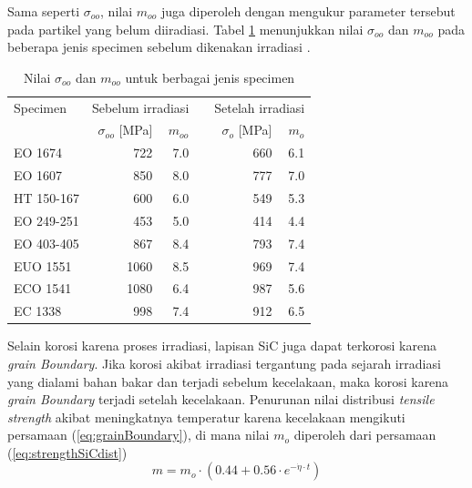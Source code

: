\documentclass[a4paper,11pt]{report}
\newcommand{\ra}[1]{\renewcommand{\arraystretch}{#1}}
\begin{document}
Sama seperti $\sigma_{oo}$, nilai $m_{oo}$ juga diperoleh dengan mengukur parameter tersebut pada partikel yang belum diiradiasi. Tabel \ref{tab:oo} menunjukkan nilai $\sigma_{oo}$ dan $m_{oo}$ pada beberapa jenis specimen sebelum dikenakan irradiasi \cite{report1}.%


\begin{table}
  \caption[Nilai $\sigma_{oo}$ dan $m_{oo}$ untuk berbagai jenis specimen]{Nilai $\sigma_{oo}$ dan $m_{oo}$ untuk berbagai jenis specimen\cite{report1}}
  \label{tab:oo}

  \begin{center}
  \ra{1.3}
    \begin{tabular}{@{}lrrcrr@{}}\toprule
    Specimen & \multicolumn{2}{c}{Sebelum irradiasi} & \phantom{abc} & \multicolumn{2}{c}{Setelah irradiasi} \\ \cmidrule{2-3} \cmidrule{5-6} 
       & $\sigma_{oo}$ [MPa] & $m_{oo}$ && $\sigma_{o}$ [MPa] & $m_{o}$ \\ \midrule%
       EO 1674 & 722 & 7.0 && 660 & 6.1\\
       EO 1607 & 850 & 8.0 && 777 & 7.0\\
       HT 150-167 & 600 & 6.0 && 549 & 5.3\\
       EO 249-251 & 453 & 5.0 && 414 & 4.4\\
       EO 403-405 & 867 & 8.4 && 793 & 7.4\\
       EUO 1551 & 1060 & 8.5 && 969 & 7.4\\
       ECO 1541 & 1080 & 6.4 && 987 & 5.6\\
       EC 1338 & 998 & 7.4 && 912 & 6.5\\ %
       \bottomrule
    \end{tabular}
  \end{center}
\end{table}


Selain korosi karena proses irradiasi, lapisan SiC juga dapat terkorosi karena \textit{grain Boundary}. Jika korosi akibat irradiasi tergantung pada sejarah irradiasi yang dialami bahan bakar dan terjadi sebelum kecelakaan, maka korosi karena \textit{grain Boundary} terjadi setelah kecelakaan. Penurunan nilai distribusi \textit{tensile strength} akibat meningkatnya temperatur karena kecelakaan mengikuti persamaan (\ref{eq:grainBoundary}), di mana nilai $m_o$ diperoleh dari persamaan (\ref{eq:strengthSiCdist})
\begin{equation}
  m=m_o \cdot \left( 0.44 + 0.56 \cdot e^{-\dot{\eta} \cdot t}\right)
  \label{eq:grainBoundary}
\end{equation}
\end{document}

